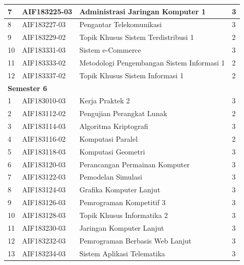 \begin{table}[H]
\begin{tabular}{|p{0.5cm}|p{2.85cm}|p{4.95cm}|p{2.7cm}|}
7   & AIF183225-03    & Administrasi Jaringan Komputer 1           & 3   \\ \hline
8   & AIF183227-03    & Pengantar Telekomunikasi                   & 3   \\ \hline
9   & AIF183229-02    & Topik Khusus Sistem Terdistribusi 1        & 2   \\ \hline
			10  & AIF183331-03    & Sistem e-Commerce                          & 3   \\ \hline
11  & AIF183333-02    & Metodologi Pengembangan Sistem Informasi 1 & 2   \\ \hline
12  & AIF183337-02    & Topik Khusus Sistem Informasi 1            & 2   \\ \hline
\multicolumn{4}{|l|}{\textbf{Semester 6}}                                \\ \hline
1   & AIF183010-03    & Kerja Praktek 2                            & 3   \\ \hline
2   & AIF183112-02    & Pengujian Perangkat Lunak                  & 2   \\ \hline
3   & AIF183114-03    & Algoritma Kriptografi                      & 3   \\ \hline
4   & AIF183116-02    & Komputasi Paralel                          & 2   \\ \hline
5   & AIF183118-03    & Komputasi Geometri                         & 3   \\ \hline
6   & AIF183120-03    & Perancangan Permainan Komputer             & 3   \\ \hline
7   & AIF183122-03    & Pemodelan Simulasi                         & 3   \\ \hline
8   & AIF183124-03    & Grafika Komputer Lanjut                    & 3   \\ \hline
9   & AIF183126-03    & Pemrograman Kompetitif 3                   & 3   \\ \hline
10  & AIF183128-03    & Topik Khusus Informatika 2                 & 3   \\ \hline
11  & AIF183230-03    & Jaringan Komputer Lanjut                   & 3   \\ \hline
12  & AIF183232-03    & Pemrograman Berbasis Web Lanjut            & 3   \\ \hline
13  & AIF183234-03    & Sistem Aplikasi Telematika                 & 3   \\ \hline
		\end{tabular}
	\label{tab:kuliahpilihan}
\end{table}

